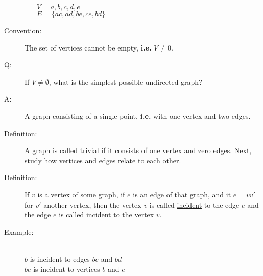 \documentclass[10pt]{article}
\begin{document}
\begin{description}
\begin{enumerate}
\begin{figure}[h!]
			\end{figure}
			$V = {a, b, c, d, e}$ \\
			$E = \{ac, ad, be, ce, bd\}$
		\end{enumerate}
		\item[Convention:] The set of vertices cannot be empty, \textbf{i.e.} $V \neq 0$.
		\item[Q:] If $V \neq \emptyset$, what is the simplest possible undirected graph?
		\item[A:] A graph consisting of a single point, \textbf{i.e.} with one vertex and two edges.
		\item[Definition:] A graph is called \underline{trivial} if it consists of one vertex and zero edges. Next, study how vertices and edges relate to each other.
		\item[Definition:] If $v$ is a vertex of some graph, if $e$ is an edge of that graph, and it $e = vv'$ for $v'$ another vertex, then the vertex $v$ is called \underline{incident} to the edge $e$ and the edge $e$ is called incident to the vertex $v$.
		\item[Example:] ~\\
		$b$ is incident to edges $be$ and $bd$ \\
		$be$ is incident to vertices $b$ and $e$
		\begin{figure}[h!]
			\centering
\end{figure}
\end{description}
\end{document}
